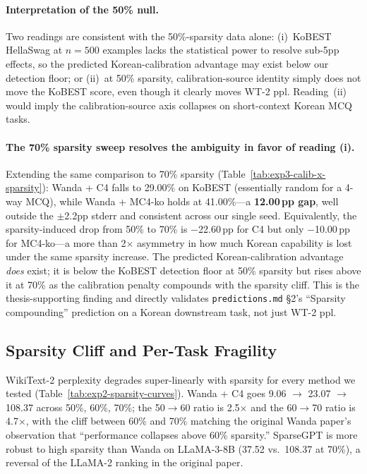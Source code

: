 \documentclass{article}
\begin{document}
\paragraph{Interpretation of the 50\% null.}
Two readings are consistent with the 50\%-sparsity data alone:
(i)~KoBEST HellaSwag at $n{=}500$ examples lacks the statistical power
to resolve sub-5pp effects, so the predicted Korean-calibration
advantage may exist below our detection floor; or
(ii)~at 50\% sparsity, calibration-source identity simply does not move
the KoBEST score, even though it clearly moves WT-2 ppl. Reading~(ii)
would imply the calibration-source axis collapses on short-context
Korean MCQ tasks.

\paragraph{The 70\% sparsity sweep resolves the ambiguity in favor of
reading (i).} Extending the same comparison to 70\% sparsity
(Table~\ref{tab:exp3-calib-x-sparsity}): Wanda + C4 falls to 29.00\%
on KoBEST (essentially random for a 4-way MCQ), while Wanda + MC4-ko
holds at 41.00\%---a \textbf{12.00\,pp gap}, well outside the $\pm$2.2pp
stderr and consistent across our single seed. Equivalently, the
sparsity-induced drop from 50\% to 70\% is $-$22.60\,pp for C4 but only
$-$10.00\,pp for MC4-ko---a more than 2$\times$ asymmetry in how much
Korean capability is lost under the same sparsity increase. The
predicted Korean-calibration advantage \emph{does} exist; it is below
the KoBEST detection floor at 50\% sparsity but rises above it at
70\% as the calibration penalty compounds with the sparsity cliff.
This is the thesis-supporting finding and directly validates
\texttt{predictions.md} \S2's ``Sparsity compounding'' prediction on a
Korean downstream task, not just WT-2 ppl.

\subsection{Sparsity Cliff and Per-Task Fragility}

WikiText-2 perplexity degrades super-linearly with sparsity for every
method we tested (Table~\ref{tab:exp2-sparsity-curves}). Wanda + C4 goes
9.06 $\rightarrow$ 23.07 $\rightarrow$ 108.37 across 50\%, 60\%, 70\%; the
50$\rightarrow$60 ratio is 2.5$\times$ and the 60$\rightarrow$70 ratio is
4.7$\times$, with the cliff between 60\% and 70\% matching the original
Wanda paper's observation that ``performance collapses above 60\%
sparsity.'' SparseGPT is more robust to high sparsity than Wanda on
LLaMA-3-8B (37.52 vs.\ 108.37 at 70\%), a reversal of the LLaMA-2 ranking
in the original paper.
\end{document}
